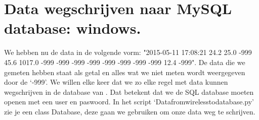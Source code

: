 \section{Data wegschrijven naar MySQL database: windows.}

We hebben nu de data in de volgende vorm: 
"2015-05-11 17:08:21	24.2	25.0	-999	45.6	1017.0	-999	-999	
-999	-999	-999	-999	-999	-999	12.4	-999". De data die we 
gemeten hebben staat als getal en alles wat we niet meten wordt weergegeven 
door de `-999'. We willen elke keer dat we zo elke regel met data kunnen
wegschrijven in de database van \hisparc.
Dat betekent dat we de SQL database moeten openen met een user en paswoord.
In het script `Datafromwirelesstodatabase.py' zie je een class Database, deze gaan we 
gebruiken om onze data weg te schrijven.
\begin{thebibliography}{9}
    
\end{thebibliography}



